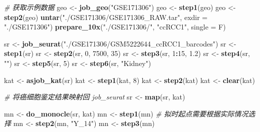 \documentclass[
]{article}
\newenvironment{Shaded}{\begin{snugshade}}{\end{snugshade}}
\newcommand{\CommentTok}[1]{\textcolor[rgb]{0.56,0.35,0.01}{\textit{#1}}}
\newcommand{\DataTypeTok}[1]{\textcolor[rgb]{0.13,0.29,0.53}{#1}}
\newcommand{\DecValTok}[1]{\textcolor[rgb]{0.00,0.00,0.81}{#1}}
\newcommand{\FloatTok}[1]{\textcolor[rgb]{0.00,0.00,0.81}{#1}}
\newcommand{\KeywordTok}[1]{\textcolor[rgb]{0.13,0.29,0.53}{\textbf{#1}}}
\newcommand{\NormalTok}[1]{#1}
\newcommand{\OperatorTok}[1]{\textcolor[rgb]{0.81,0.36,0.00}{\textbf{#1}}}
\newcommand{\StringTok}[1]{\textcolor[rgb]{0.31,0.60,0.02}{#1}}
\begin{document}
\begin{Shaded}
\begin{Highlighting}[]
\CommentTok{\# 获取示例数据}
\NormalTok{geo \textless{}{-}}\StringTok{ }\KeywordTok{job\_geo}\NormalTok{(}\StringTok{"GSE171306"}\NormalTok{)}
\NormalTok{geo \textless{}{-}}\StringTok{ }\KeywordTok{step1}\NormalTok{(geo)}
\NormalTok{geo \textless{}{-}}\StringTok{ }\KeywordTok{step2}\NormalTok{(geo)}
\KeywordTok{untar}\NormalTok{(}\StringTok{"./GSE171306/GSE171306\_RAW.tar"}\NormalTok{, }\DataTypeTok{exdir =} \StringTok{"./GSE171306"}\NormalTok{)}
\KeywordTok{prepare\_10x}\NormalTok{(}\StringTok{"./GSE171306/"}\NormalTok{, }\StringTok{"ccRCC1"}\NormalTok{, }\DataTypeTok{single =}\NormalTok{ F)}

\NormalTok{sr \textless{}{-}}\StringTok{ }\KeywordTok{job\_seurat}\NormalTok{(}\StringTok{"./GSE171306/GSM5222644\_ccRCC1\_barcodes"}\NormalTok{)}
\NormalTok{sr \textless{}{-}}\StringTok{ }\KeywordTok{step1}\NormalTok{(sr)}
\NormalTok{sr \textless{}{-}}\StringTok{ }\KeywordTok{step2}\NormalTok{(sr, }\DecValTok{0}\NormalTok{, }\DecValTok{7500}\NormalTok{, }\DecValTok{35}\NormalTok{)}
\NormalTok{sr \textless{}{-}}\StringTok{ }\KeywordTok{step3}\NormalTok{(sr, }\DecValTok{1}\OperatorTok{:}\DecValTok{15}\NormalTok{, }\FloatTok{1.2}\NormalTok{)}
\NormalTok{sr \textless{}{-}}\StringTok{ }\KeywordTok{step4}\NormalTok{(sr, }\StringTok{""}\NormalTok{)}
\NormalTok{sr \textless{}{-}}\StringTok{ }\KeywordTok{step5}\NormalTok{(sr, }\DecValTok{5}\NormalTok{)}
\NormalTok{sr \textless{}{-}}\StringTok{ }\KeywordTok{step6}\NormalTok{(sr, }\StringTok{"Kidney"}\NormalTok{)}

\NormalTok{kat \textless{}{-}}\StringTok{ }\KeywordTok{asjob\_kat}\NormalTok{(sr)}
\NormalTok{kat \textless{}{-}}\StringTok{ }\KeywordTok{step1}\NormalTok{(kat, }\DecValTok{8}\NormalTok{)}
\NormalTok{kat \textless{}{-}}\StringTok{ }\KeywordTok{step2}\NormalTok{(kat)}
\NormalTok{kat \textless{}{-}}\StringTok{ }\KeywordTok{clear}\NormalTok{(kat)}

\CommentTok{\# 将癌细胞鉴定结果映射回 \textasciigrave{}job\_seurat\textasciigrave{}}
\NormalTok{sr \textless{}{-}}\StringTok{ }\KeywordTok{map}\NormalTok{(sr, kat)}

\NormalTok{mn \textless{}{-}}\StringTok{ }\KeywordTok{do\_monocle}\NormalTok{(sr, kat)}
\NormalTok{mn \textless{}{-}}\StringTok{ }\KeywordTok{step1}\NormalTok{(mn)}
\CommentTok{\# 拟时起点需要根据实际情况选择}
\NormalTok{mn \textless{}{-}}\StringTok{ }\KeywordTok{step2}\NormalTok{(mn, }\StringTok{"Y\_14"}\NormalTok{)}
\NormalTok{mn \textless{}{-}}\StringTok{ }\KeywordTok{step3}\NormalTok{(mn)}
\end{Highlighting}
\end{Shaded}
\end{document}

